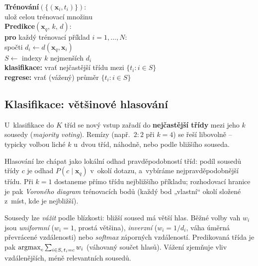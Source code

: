 \begin{algo}
\textbf{Trénování}$(\{(\mathbf{x}_i,t_i)\})$:\\
\hspace*{1.5em} ulož celou trénovací množinu \\[3pt]
\textbf{Predikce}$(\mathbf{x}_q,\,k,\,d)$:\\
\hspace*{1.5em} \textbf{pro} každý trénovací příklad $i=1,\dots,N$:\\
\hspace*{3em} spočti $d_i \leftarrow d(\mathbf{x}_q,\mathbf{x}_i)$ \\
\hspace*{1.5em} $S \leftarrow$ indexy $k$ nejmenších $d_i$ \\
\hspace*{1.5em} \textbf{klasifikace:} vrať nejčastější třídu mezi $\{t_i : i\in S\}$ \\
\hspace*{1.5em} \textbf{regrese:} vrať (vážený) průměr $\{t_i : i\in S\}$
\end{algo}

\subsection{Klasifikace: většinové hlasování}

U~klasifikace do $K$ tříd se nový vstup zařadí do \textbf{nejčastější třídy} mezi jeho $k$ sousedy (\emph{majority voting}). Remízy (např.\ $2\!:\!2$ při $k=4$) se řeší libovolně -- typicky volbou liché $k$ u~dvou tříd, náhodně, nebo podle bližšího souseda.

\begin{intuice}
Hlasování lze chápat jako lokální odhad pravděpodobností tříd: podíl sousedů třídy $c$ je odhad $P(c\mid\mathbf{x}_q)$ v~okolí dotazu, a~vybíráme nejpravděpodobnější třídu. Při $k=1$ dostaneme přímo třídu nejbližšího příkladu; rozhodovací hranice je pak \emph{Voroného diagram} trénovacích bodů (každý bod „vlastní`` okolí složené z~míst, kde je nejbližší).
\end{intuice}

\begin{poznamka}
Sousedy lze \emph{vážit} podle blízkosti: bližší soused má větší hlas. Běžné volby vah $w_i$ jsou \emph{uniformní} ($w_i=1$, prostá většina), \emph{inverzní} ($w_i=1/d_i$, váha úměrná převrácené vzdálenosti) nebo \emph{softmax} záporných vzdáleností. Predikovaná třída je pak $\operatorname*{argmax}_{c}\sum_{i\in S,\,t_i=c} w_i$ (váhovaný součet hlasů). Vážení zjemňuje vliv vzdálenějších, méně relevantních sousedů.
\end{poznamka}

